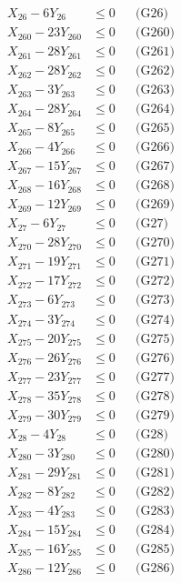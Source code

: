\documentclass[a4paper,10pt]{article}
\begin{document}
{\begin{align}
X_{26} - 6Y_{26} &\leq 0 && \text{(G26)} \\
\allowbreak
X_{260} - 23Y_{260} &\leq 0 && \text{(G260)} \\
X_{261} - 28Y_{261} &\leq 0 && \text{(G261)} \\
X_{262} - 28Y_{262} &\leq 0 && \text{(G262)} \\
X_{263} - 3Y_{263} &\leq 0 && \text{(G263)} \\
X_{264} - 28Y_{264} &\leq 0 && \text{(G264)} \\
X_{265} - 8Y_{265} &\leq 0 && \text{(G265)} \\
X_{266} - 4Y_{266} &\leq 0 && \text{(G266)} \\
X_{267} - 15Y_{267} &\leq 0 && \text{(G267)} \\
X_{268} - 16Y_{268} &\leq 0 && \text{(G268)} \\
X_{269} - 12Y_{269} &\leq 0 && \text{(G269)} \\
X_{27} - 6Y_{27} &\leq 0 && \text{(G27)} \\
X_{270} - 28Y_{270} &\leq 0 && \text{(G270)} \\
X_{271} - 19Y_{271} &\leq 0 && \text{(G271)} \\
X_{272} - 17Y_{272} &\leq 0 && \text{(G272)} \\
X_{273} - 6Y_{273} &\leq 0 && \text{(G273)} \\
X_{274} - 3Y_{274} &\leq 0 && \text{(G274)} \\
X_{275} - 20Y_{275} &\leq 0 && \text{(G275)} \\
X_{276} - 26Y_{276} &\leq 0 && \text{(G276)} \\
X_{277} - 23Y_{277} &\leq 0 && \text{(G277)} \\
X_{278} - 35Y_{278} &\leq 0 && \text{(G278)} \\
\allowbreak
X_{279} - 30Y_{279} &\leq 0 && \text{(G279)} \\
X_{28} - 4Y_{28} &\leq 0 && \text{(G28)} \\
X_{280} - 3Y_{280} &\leq 0 && \text{(G280)} \\
X_{281} - 29Y_{281} &\leq 0 && \text{(G281)} \\
X_{282} - 8Y_{282} &\leq 0 && \text{(G282)} \\
X_{283} - 4Y_{283} &\leq 0 && \text{(G283)} \\
X_{284} - 15Y_{284} &\leq 0 && \text{(G284)} \\
X_{285} - 16Y_{285} &\leq 0 && \text{(G285)} \\
X_{286} - 12Y_{286} &\leq 0 && \text{(G286)} \\

\end{align}}
\end{document}
